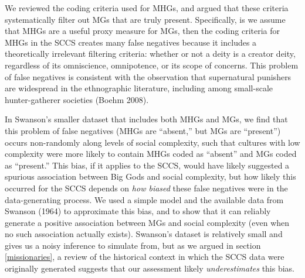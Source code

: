 \documentclass[
]{article}
\begin{document}
We reviewed the coding criteria used for MHGs, and argued that these criteria systematically filter out MGs that are truly present. Specifically, is we assume that MHGs are a useful proxy measure for MGs, then the coding criteria for MHGs in the SCCS creates many false negatives because it includes a theoretically irrelevant filtering criteria: whether or not a deity is a creator deity, regardless of its omniscience, omnipotence, or its scope of concerns. This problem of false negatives is consistent with the observation that supernatural punishers are widespread in the ethnographic literature, including among small-scale hunter-gatherer societies (Boehm 2008).

In Swanson's smaller dataset that includes both MHGs and MGs, we find that this problem of false negatives (MHGs are ``absent,'' but MGs are ``present'') occurs non-randomly along levels of social complexity, such that cultures with low complexity were more likely to contain MHGs coded as ``absent'' and MGs coded as ``present.'' This bias, if it applies to the SCCS, would have likely suggested a spurious association between Big Gods and social complexity, but how likely this occurred for the SCCS depends on \emph{how biased} these false negatives were in the data-generating process. We used a simple model and the available data from Swanson (1964) to approximate this bias, and to show that it can reliably generate a positive association between MGs and social complexity (even when no such association actually exists). Swanson's dataset is relatively small and gives us a noisy inference to simulate from, but as we argued in section \ref{missionaries}, a review of the historical context in which the SCCS data were originally generated suggests that our assessment likely \emph{underestimates} this bias.
\end{document}
